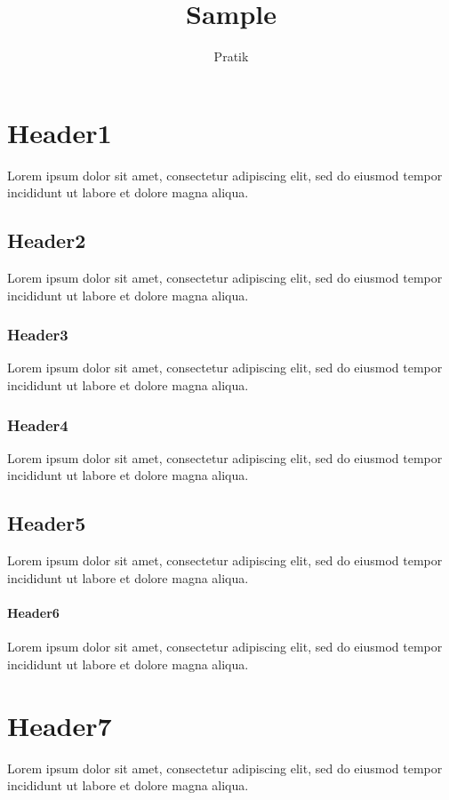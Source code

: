 \documentclass[12pt]{article}
\begin{document}
\title{Sample}
\author{Pratik}\maketitle

\section{Header1}
Lorem ipsum dolor sit amet, consectetur adipiscing elit, sed do eiusmod tempor incididunt ut labore et dolore magna aliqua.
\subsection{Header2}
Lorem ipsum dolor sit amet, consectetur adipiscing elit, sed do eiusmod tempor incididunt ut labore et dolore magna aliqua.
\subsubsection{Header3}
Lorem ipsum dolor sit amet, consectetur adipiscing elit, sed do eiusmod tempor incididunt ut labore et dolore magna aliqua.
\subsubsection{Header4}
Lorem ipsum dolor sit amet, consectetur adipiscing elit, sed do eiusmod tempor incididunt ut labore et dolore magna aliqua.
\subsection{Header5}
Lorem ipsum dolor sit amet, consectetur adipiscing elit, sed do eiusmod tempor incididunt ut labore et dolore magna aliqua.
\paragraph{Header6}
Lorem ipsum dolor sit amet, consectetur adipiscing elit, sed do eiusmod tempor incididunt ut labore et dolore magna aliqua.
\section{Header7}
Lorem ipsum dolor sit amet, consectetur adipiscing elit, sed do eiusmod tempor incididunt ut labore et dolore magna aliqua.
\end{document}
